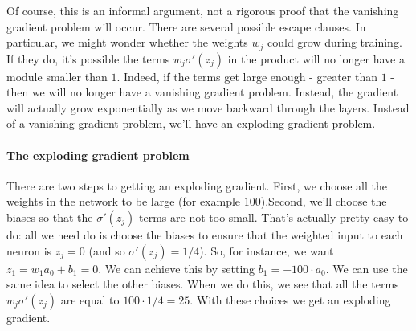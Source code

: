 \documentclass[12pt, letterpaper]{article}
\theoremstyle{definition}
\let\tb\textbf
\begin{document}
Of course, this is an informal argument, not a rigorous proof that the vanishing gradient problem will occur. There are several possible escape clauses. In particular, we might wonder whether the weights $w_j$ could grow during training. If they do, it's possible the terms $w_j\sigma'(z_j)$ in the product will no longer have a module smaller than $1$. Indeed, if the terms get large enough - greater than $1$ - then we will no longer have a vanishing gradient problem. Instead, the gradient will actually grow exponentially as we move backward through the layers. Instead of a vanishing gradient problem, we'll have an exploding gradient problem.

\paragraph{\tb{The exploding gradient problem}} There are two steps to getting an exploding gradient. First, we choose all the weights in the network to be large (for example $100$).Second, we'll choose the biases so that the $\sigma'(z_j)$ terms are not too small. That's actually pretty easy to do: all we need do is choose the biases to ensure that the weighted input to each neuron is $z_j=0$ (and so $\sigma'(z_j)=1/4$). So, for instance, we want $z_1=w_1a_0+b_1=0$. We can achieve this by setting $b_1=-100\cdot a_0$. We can use the same idea to select the other biases. When we do this, we see that all the terms $w_j\sigma'(z_j)$ are equal to $100\cdot 1/4=25$. With these choices we get an exploding gradient.
\end{document}
